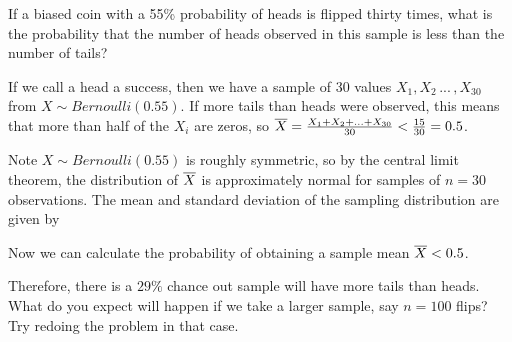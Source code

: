 \begin{examp}
If a biased coin with a 55\% probability of heads is flipped thirty times, what is the probability that the number of heads observed in this sample is less than the number of tails?
\par
\noindent If we call a head a success, then we have a sample of 30 values $X_1,X_2\,...\,,X_{30}$ from $X \sim Bernoulli(0.55)$. If more tails than heads were observed, this means that more than half of the $X_i$ are zeros, so ${\overline{X}} = \frac{X_1 + X_2 + ... + X_{30}}{30} < \frac{15}{30} =0.5$.
\par
\noindent Note $X \sim Bernoulli(0.55)$ is roughly symmetric, so by the central limit theorem, the distribution of ${\overline{X}}$ is approximately normal for samples of $n = 30$ observations. The mean and standard deviation of the sampling distribution are given by 
\par
\noindent Now we can calculate the probability of obtaining a sample mean ${\overline{X}} < 0.5$.


\begin{center}
    \begin{minipage}{.5\textwidth}
        \centering
  \vspace{1.25em}
    \end{minipage}%
    \begin{minipage}{0.5\textwidth}
        \centering
\end{minipage}
\end{center}
Therefore, there is a $29\%$ chance out sample will have more tails than heads. What do you expect will happen if we take a larger sample, say $n=100$ flips? Try redoing the problem in that case.
\end{examp}

